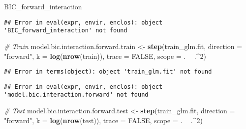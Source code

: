 \documentclass[]{article}
\newenvironment{Shaded}{\begin{snugshade}}{\end{snugshade}}
\newcommand{\CommentTok}[1]{\textcolor[rgb]{0.56,0.35,0.01}{\textit{#1}}}
\newcommand{\DataTypeTok}[1]{\textcolor[rgb]{0.13,0.29,0.53}{#1}}
\newcommand{\DecValTok}[1]{\textcolor[rgb]{0.00,0.00,0.81}{#1}}
\newcommand{\KeywordTok}[1]{\textcolor[rgb]{0.13,0.29,0.53}{\textbf{#1}}}
\newcommand{\NormalTok}[1]{#1}
\newcommand{\OperatorTok}[1]{\textcolor[rgb]{0.81,0.36,0.00}{\textbf{#1}}}
\newcommand{\OtherTok}[1]{\textcolor[rgb]{0.56,0.35,0.01}{#1}}
\newcommand{\StringTok}[1]{\textcolor[rgb]{0.31,0.60,0.02}{#1}}
\begin{document}
\begin{Shaded}
\begin{Highlighting}[]
\NormalTok{BIC_forward_interaction}
\end{Highlighting}
\end{Shaded}

\begin{verbatim}
## Error in eval(expr, envir, enclos): object 'BIC_forward_interaction' not found
\end{verbatim}

\begin{Shaded}
\begin{Highlighting}[]
\CommentTok{# Train}
\NormalTok{model.bic.interaction.forward.train <-}\StringTok{ }\KeywordTok{step}\NormalTok{(train_glm.fit, }\DataTypeTok{direction =} \StringTok{"forward"}\NormalTok{, }\DataTypeTok{k =} \KeywordTok{log}\NormalTok{(}\KeywordTok{nrow}\NormalTok{(train)), }
                                      \DataTypeTok{trace =} \OtherTok{FALSE}\NormalTok{, }\DataTypeTok{scope =}\NormalTok{ . }\OperatorTok{~}\StringTok{ }\NormalTok{.}\OperatorTok{^}\DecValTok{2}\NormalTok{)}
\end{Highlighting}
\end{Shaded}

\begin{verbatim}
## Error in terms(object): object 'train_glm.fit' not found
\end{verbatim}

\begin{Shaded}
\end{Shaded}

\begin{verbatim}
## Error in eval(expr, envir, enclos): object 'model.bic.interaction.forward' not found
\end{verbatim}

\begin{Shaded}
\begin{Highlighting}[]
\CommentTok{# Test}
\NormalTok{model.bic.interaction.forward.test <-}\StringTok{ }\KeywordTok{step}\NormalTok{(train_glm.fit, }\DataTypeTok{direction =} \StringTok{"forward"}\NormalTok{, }\DataTypeTok{k =} \KeywordTok{log}\NormalTok{(}\KeywordTok{nrow}\NormalTok{(test)), }\DataTypeTok{trace =} \OtherTok{FALSE}\NormalTok{,}
                                      \DataTypeTok{scope =}\NormalTok{ . }\OperatorTok{~}\StringTok{ }\NormalTok{.}\OperatorTok{^}\DecValTok{2}\NormalTok{)}
\end{Highlighting}
\end{Shaded}
\end{document}
